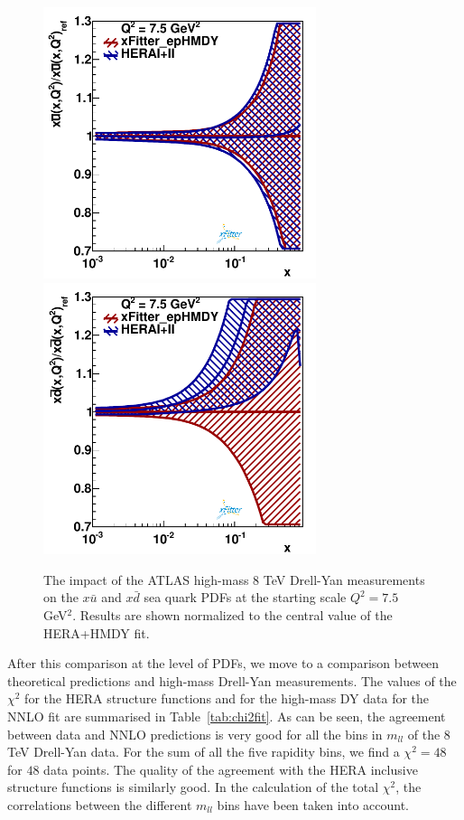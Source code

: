 \begin{figure}[t]
\centering
\includegraphics[width=8cm]{figs/q2_7_5_pdf_ubar_ratio.pdf}
\includegraphics[width=8cm]{figs/q2_7_5_pdf_dbar_ratio.pdf} 
\caption{The impact of the ATLAS high-mass 8 TeV Drell-Yan measurements
  on the $x\bar{u}$ and $x\bar{d}$ sea quark PDFs at the starting scale $Q^2=7.5$ GeV$^2$.
  Results are shown normalized to the central value of the HERA+HMDY
  fit.  }
\label{fig:QCDfit}
\end{figure}

After this comparison at the level of PDFs, we move to a comparison
between theoretical predictions and high-mass Drell-Yan measurements.
%
The values of the $\chi^2$ for the HERA structure functions and for
the high-mass DY data for the NNLO fit are summarised in
Table~\ref{tab:chi2fit}.
%
As can be seen, the agreement between data and NNLO predictions is
very good for all the bins in $m_{ll}$ of the $8$ TeV Drell-Yan data.
%
For the sum of all the five rapidity bins, we find a $\chi^2=48$ for
$48$ data points.
%
The quality of the agreement with the HERA inclusive structure
functions is similarly good.
%
In the calculation of the total $\chi^2$, the correlations between the
different $m_{ll}$ bins have been taken into account.

